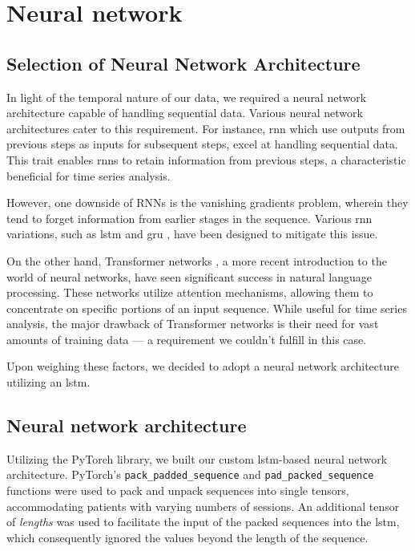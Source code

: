 \chapter{Neural network}\label{chap:nn}

\section{Selection of Neural Network Architecture}

In light of the temporal nature of our data, we required a neural network
architecture capable of handling sequential data. Various neural network
architectures cater to this requirement. For instance, \gls{rnn} which use
outputs from previous steps as inputs for subsequent steps, excel at handling
sequential data. This trait enables \gls{rnn}s to retain information from
previous steps, a characteristic beneficial for time series analysis.

However, one downside of RNNs is the vanishing gradients problem, wherein they
tend to forget information from earlier stages in the sequence. Various
\gls{rnn} variations, such as \gls{lstm} \cite{lstm:1997} and \gls{gru}
\cite{gru:2014}, have been designed to mitigate this issue.

On the other hand, Transformer networks \cite{attention2017}, a more recent
introduction to the world of neural networks, have seen significant success in
natural language processing. These networks utilize attention mechanisms,
allowing them to concentrate on specific portions of an input sequence. While
useful for time series analysis, the major drawback of Transformer networks is
their need for vast amounts of training data --- a
requirement we couldn't fulfill in this case.

Upon weighing these factors, we decided to adopt a neural network architecture
utilizing an \gls{lstm}.

\section{Neural network architecture}

Utilizing the PyTorch library, we built our custom \gls{lstm}-based neural
network architecture. PyTorch's \texttt{pack\_padded\_sequence} and
\texttt{pad\_packed\_sequence} functions were used to pack and unpack sequences
into single tensors, accommodating patients with varying numbers of sessions.
An additional tensor of \textit{lengths} was used to facilitate the input of
the packed sequences into the \gls{lstm}, which consequently ignored the values
beyond the length of the sequence.

